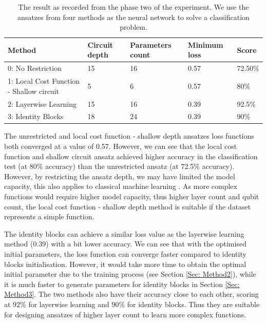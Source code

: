 \begin{table}
    \centering
    \begin{tabular}{|| p{4cm} p{2cm} p{2cm} p{2cm} p{2cm} ||}
        \hline
        \textbf{Method} & \textbf{Circuit depth} & \textbf{Parameters count} & \textbf{Minimum loss} & \textbf{Score} \\
        \hline \hline
        0: No Restriction             & 15                     & 16                        & 0.57                  & 72.50\%        \\
        1: Local Cost Function - Shallow circuit             & 5                      & 6                         & 0.57                  & 80\%           \\
        2: Layerwise Learning             & 15                     & 16                        & 0.39                  & 92.5\%         \\
        3: Identity Blocks             & 18                     & 24                        & 0.39                  & 90\%           \\
        \hline
    \end{tabular}
    \caption{
        The result as recorded from the phase two of the experiment.
        We use the ansatzes from four methods as the neural network to solve a classification problem.
    }
    \label{Tab: Experiment Phase 2 Res}
\end{table}

The unrestricted and local cost function - shallow depth ansatzes loss functions both converged at a value of 0.57.
However, we can see that the local cost function and shallow circuit ansatz achieved higher accuracy in the classification test (at 80\% accuracy) than the unrestricted ansatz (at 72.5\% accuracy).
However, by restricting the ansatz depth, we may have limited the model capacity, this also applies to classical machine learning \cite{ianDeepLearningAdaptive2016}.
As more complex functions would require higher model capacity, thus higher layer count and qubit count, the local cost function - shallow depth method is suitable if the dataset represents a simple function.

The identity blocks can achieve a similar loss value as the layerwise learning method (0.39) with a bit lower accuracy.
We can see that with the optimised initial parameters, the loss function can converge faster compared to identity blocks initialisation.
However, it would take more time to obtain the optimal initial parameter due to the training process (see Section \ref{Sec: Method2}), while it is much faster to generate parameters for identity blocks in Section \ref{Sec: Method3}.
The two methods also have their accuracy close to each other, scoring at 92\% for layerwise learning and 90\% for identity blocks.
Thus they are suitable for designing ansatzes of higher layer count to learn more complex functions.


